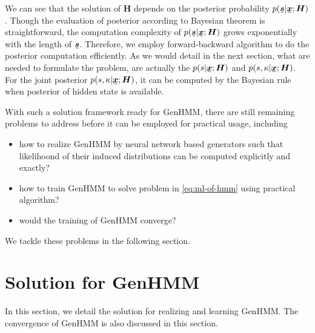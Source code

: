 \documentclass{ecai}
\newcommand{\ubar}[1]{\mkern2mu\underline{\mkern-2mu #1\mkern-2mu}\mkern2mu}
\newcommand{\ubm}[1]{\ubar{\bm{#1}}}
\begin{document}
We can see that the solution of $\bm{H}$ depends on the posterior probability $p(\ubm{s}| \ubm{x}; \bm{H})$. Though the evaluation of posterior according to Bayesian theorem is straightforward, the computation complexity of $p(\ubm{s}| \ubm{x}; \bm{H})$ grows exponentially with the length of $\ubm{s}$. Therefore, we employ forward-backward algorithm \cite{Bishop:2006:PRM:1162264} to do the posterior computation efficiently. As we would detail in the next section, what are needed to formulate the problem, are actually the $p(s| \ubm{x}; \bm{H})$ and $p(s, \kappa| \ubm{x}; \bm{H})$. For the joint posterior $p(s, \kappa| \ubm{x}; \bm{H})$, it can be computed by the Bayesian rule when posterior of hidden state is available.


With such a solution framework ready for GenHMM, there are still remaining problems to address before it can be employed for practical usage, including
\begin{itemize}
\item how to realize GenHMM by neural network based generators such that likelihoond of their induced distributions can be computed explicitly and exactly?
\item how to train GenHMM to solve problem in \eqref{eq:ml-of-hmm} using practical algorithm?
\item would the training of GenHMM converge?
\end{itemize}
We tackle these problems in the following section.



\section{Solution for GenHMM}

In this section, we detail the solution for realizing and learning GenHMM. %
The convergence of GenHMM is also discussed in this section.
\end{document}
